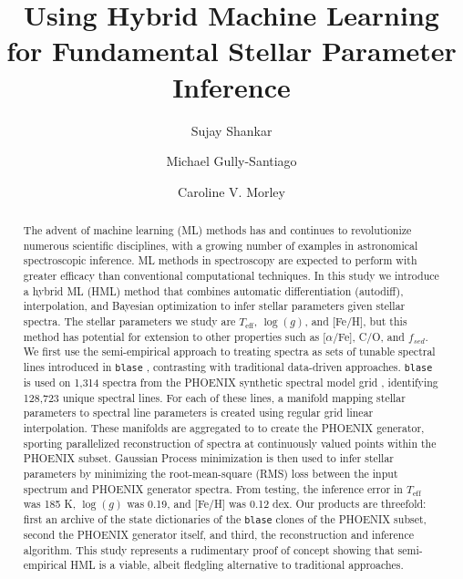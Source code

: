 \documentclass[twocolumn]{aastex631}
\begin{document}
\title{Using Hybrid Machine Learning for Fundamental Stellar Parameter Inference}
\author[0000-0002-2290-6810]{Sujay Shankar}
\author[0000-0002-4020-3457]{Michael Gully-Santiago}
\author[0000-0002-4404-0456]{Caroline V. Morley}


\begin{abstract}
    The advent of machine learning (ML) methods has and continues to revolutionize numerous scientific disciplines, with a growing number of examples in astronomical spectroscopic inference.
    ML methods in spectroscopy are expected to perform with greater efficacy than conventional computational techniques.
    In this study we introduce a hybrid ML (HML) method that combines automatic differentiation (autodiff), interpolation, and Bayesian optimization to infer stellar parameters given stellar spectra.
    The stellar parameters we study are $T_{\mathrm{eff}}$, $\log(g)$, and [Fe/H], but this method has potential for extension to other properties such as [$\alpha$/Fe], C/O, and $f_{sed}$.
    We first use the semi-empirical approach to treating spectra as sets of tunable spectral lines introduced in \texttt{blase} \citep{blase}, contrasting with traditional data-driven approaches. 
    \texttt{blase} is used on 1,314 spectra from the PHOENIX synthetic spectral model grid \citep{PHOENIX}, identifying 128,723 unique spectral lines.
    For each of these lines, a manifold mapping stellar parameters to spectral line parameters is created using regular grid linear interpolation.
    These manifolds are aggregated to to create the PHOENIX generator, sporting parallelized reconstruction of spectra at continuously valued points within the PHOENIX subset.
    Gaussian Process minimization is then used to infer stellar parameters by minimizing the root-mean-square (RMS) loss between the input spectrum and PHOENIX generator spectra.
    From testing, the inference error in $T_{\mathrm{eff}}$ was 185 K, $\log(g)$ was 0.19, and [Fe/H] was 0.12 dex.
    Our products are threefold: first an archive of the state dictionaries of the \texttt{blase} clones of the PHOENIX subset, second the PHOENIX generator itself, and third, the reconstruction and inference algorithm.
    This study represents a rudimentary proof of concept showing that semi-empirical HML is a viable, albeit fledgling alternative to traditional approaches.
\end{abstract}
\end{document}
